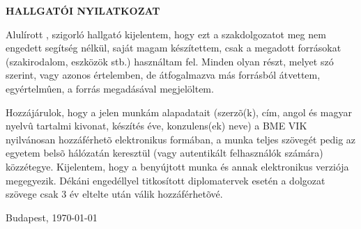 \begin{center}
\large
\textbf{HALLGATÓI NYILATKOZAT}\\
\end{center}

Alulírott \emph{\vikszerzo}, szigorló hallgató kijelentem, hogy ezt a szakdolgozatot meg nem
engedett segítség nélkül, saját magam készítettem, csak a megadott forrásokat (szakirodalom,
eszközök stb.) használtam fel. Minden olyan részt, melyet szó szerint, vagy azonos értelemben, de
átfogalmazva más forrásból átvettem, egyértelmûen, a forrás megadásával megjelöltem.

Hozzájárulok, hogy a jelen munkám alapadatait (szerzõ(k), cím, angol és magyar nyelvû tartalmi
kivonat, készítés éve, konzulens(ek) neve) a BME VIK nyilvánosan hozzáférhetõ elektronikus formában,
a munka teljes szövegét pedig az egyetem belsõ hálózatán keresztül (vagy autentikált felhasználók
számára) közzétegye. Kijelentem, hogy a benyújtott munka és annak elektronikus verziója megegyezik.
Dékáni engedéllyel titkosított diplomatervek esetén a dolgozat szövege csak 3 év eltelte után válik
hozzáférhetõvé.

\begin{flushleft}
\vspace*{1cm}
Budapest, \today
\end{flushleft}

\begin{flushright}
 \vspace*{1cm}
 \makebox[7cm]{\rule{6cm}{.4pt}}\\
 \makebox[7cm]{\emph{\vikszerzo}}\\
\end{flushright}
\thispagestyle{empty}

\vfill
\clearpage
\thispagestyle{empty} %
